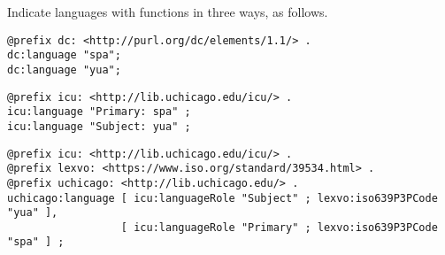 \documentclass[11pt]{article}
\begin{document}
Indicate languages with functions in three ways, as follows.

\begin{verbatim}
@prefix dc: <http://purl.org/dc/elements/1.1/> .
dc:language "spa";
dc:language "yua";
\end{verbatim}

\begin{verbatim}
@prefix icu: <http://lib.uchicago.edu/icu/> .
icu:language "Primary: spa" ;
icu:language "Subject: yua" ;
\end{verbatim}

\begin{verbatim}
@prefix icu: <http://lib.uchicago.edu/icu/> .
@prefix lexvo: <https://www.iso.org/standard/39534.html> .
@prefix uchicago: <http://lib.uchicago.edu/> .
uchicago:language [ icu:languageRole "Subject" ; lexvo:iso639P3PCode "yua" ],
                  [ icu:languageRole "Primary" ; lexvo:iso639P3PCode "spa" ] ;
\end{verbatim}
\end{document}
